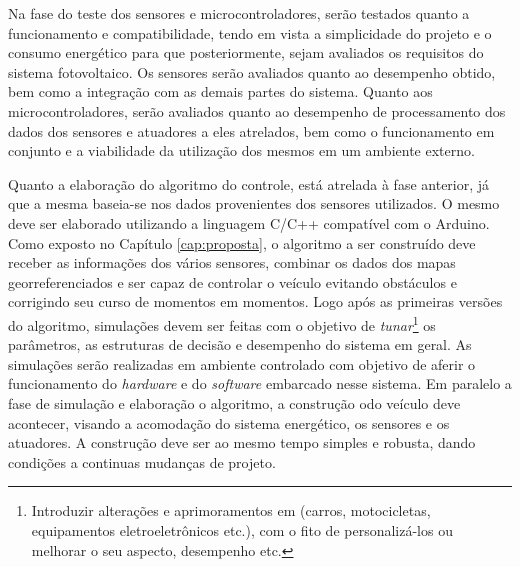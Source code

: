 Na fase do teste dos sensores e microcontroladores, serão testados quanto a funcionamento e compatibilidade, tendo em vista a simplicidade do projeto e o consumo energético para que posteriormente, sejam avaliados os requisitos do sistema fotovoltaico. Os  sensores serão avaliados quanto ao desempenho obtido, bem como a integração com as demais partes do sistema. Quanto aos microcontroladores, serão avaliados quanto ao desempenho de processamento dos dados dos sensores e atuadores a eles atrelados, bem como o funcionamento em conjunto e a viabilidade da utilização dos mesmos em um ambiente externo.

Quanto a elaboração do algoritmo do controle, está atrelada à fase anterior, já que a mesma baseia-se nos dados provenientes dos sensores utilizados. O mesmo deve ser elaborado utilizando a linguagem C/C++ compatível com o Arduino. Como exposto no Capítulo \ref{cap:proposta}, o algoritmo a ser construído deve receber as informações dos vários sensores, combinar os dados dos mapas georreferenciados e ser capaz de controlar o veículo evitando obstáculos e corrigindo seu curso de momentos em momentos. Logo após as primeiras versões do algoritmo, simulações devem ser feitas com o objetivo de \textit{tunar}\footnote{Introduzir alterações e aprimoramentos em (carros, motocicletas, equipamentos eletroeletrônicos etc.), com o fito de personalizá-los ou melhorar o seu aspecto, desempenho etc.} os parâmetros, as estruturas de decisão e desempenho do sistema em geral. As simulações serão realizadas em ambiente controlado com objetivo de aferir o funcionamento do \textit{hardware} e do \textit{software} embarcado nesse sistema. Em paralelo a fase de simulação e elaboração o algoritmo, a construção odo veículo deve acontecer, visando a acomodação do sistema energético, os sensores e os atuadores. A construção deve ser ao mesmo tempo simples e robusta, dando condições a continuas mudanças de projeto.

